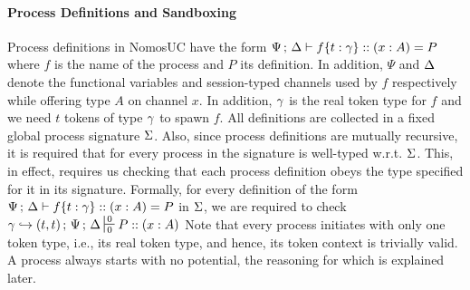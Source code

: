 
\paragraph*{\textbf{Process Definitions and Sandboxing}}
Process definitions in NomosUC have the form
$\Psi \, ; \, \Delta \vdash f\{t : \gamma\} :: (x : A) = P$ where $f$
is the name of the process and $P$ its definition.
In addition, $\Psi$ and $\Delta$ denote the functional variables and session-typed channels
used by $f$ respectively while offering type $A$ on channel $x$.
In addition, $\gamma$ is the real token type for $f$ and we need $t$ tokens of type $\gamma$
to spawn $f$.
All definitions are collected in a fixed global process signature $\Sigma$.
Also, since process definitions are mutually recursive, it is required that
for every process in the signature is well-typed w.r.t. $\Sigma$.
This, in effect, requires us checking that each process definition obeys the type
specified for it in its signature.
Formally, for every definition of the form $\Psi \, ; \, \Delta \vdash f\{t : \gamma\} :: (x : A) = P$ in $\Sigma$,
we are required to check $\K \hookrightarrow (t, t) \semi \Psi \semi \D \entailpot{0}{0} P :: (x : A)$
Note that every process initiates with only one token type, i.e., its real token type,
and hence, its token context is trivially valid.
A process always starts with no potential, the reasoning for which is explained later.

